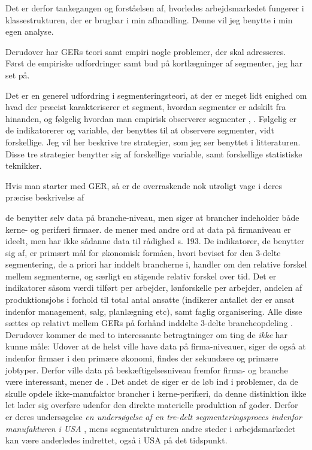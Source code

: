 Det er derfor tankegangen og forståelsen af, hvorledes arbejdsmarkedet fungerer i klassestrukturen, der er brugbar i min afhandling. Denne vil jeg benytte i min egen analyse. 




Derudover har GERs teori samt empiri nogle problemer, der skal adresseres. Først de empiriske udfordringer samt bud på kortlægninger af segmenter, jeg har set på.

Det er en generel udfordring i segmenteringsteori, at der er meget lidt enighed om hvad der præcist karakteriserer et segment, hvordan segmenter er adskilt fra hinanden, og følgelig hvordan man empirisk observerer segmenter \parencite[71]{Leontaridi1998}, \parencite[1231]{Cain1976}. Følgelig er de indikatorerer og variable, der benyttes til at observere segmenter, vidt forskellige. Jeg vil her beskrive tre strategier, som jeg ser benyttet i litteraturen. Disse tre strategier benytter sig af forskellige variable, samt forskellige statistiske teknikker. 

Hvis man starter med GER, så er de overraskende nok utroligt vage i deres præcise beskrivelse af 

de benytter selv data på branche-niveau, men siger at brancher  indeholder både kerne- og perifæri firmaer. de mener med andre ord at data på firmaniveau er ideelt, men har ikke sådanne data til rådighed s. 193. De indikatorer, de benytter sig af, er primært mål for økonomisk formåen, hvori beviset for den 3-delte segmentering, de a priori har inddelt brancherne i, handler om den relative forskel mellem segmenterne, og særligt en stigende relativ forskel over tid. Det er indikatorer såsom værdi tilført per arbejder, lønforskelle per arbejder, andelen af produktionsjobs i forhold til total antal ansatte (indikerer antallet der er ansat indenfor management, salg, planlægning etc), samt faglig organisering. Alle disse sættes op relativt mellem GERs på forhånd inddelte 3-delte brancheopdeling \parencite[193]{Gordon1982}. Derudover kommer de med to interessante betragtninger om ting de \emph{ikke} har kunne måle: Udover at de helst ville have data på firma-niveauer, siger de også at indenfor firmaer i den primære økonomi, findes der sekundære og primære jobtyper. Derfor ville data på beskæftigelsesniveau fremfor firma- og branche være interessant, mener de \parencite[193]{Gordon1982}. 
Det andet de siger er de løb ind i problemer, da de skulle opdele ikke-manufaktor brancher i kerne-perifæri, da denne distinktion ikke let lader sig overføre udenfor den direkte materielle produktion af goder. Derfor er deres undersøgelse \emph{en undersøgelse af en tre-delt segmenteringsproces indenfor manufakturen i USA} \parencite[199]{Gordon1982}, mens segmentstrukturen andre steder i arbejdsmarkedet kan være anderledes indrettet, også i USA på det tidspunkt.

